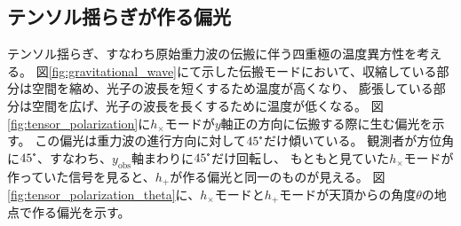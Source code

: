 \documentclass[../../main.tex]{subfiles}
\begin{document}
\subsection{テンソル揺らぎが作る偏光}
テンソル揺らぎ、すなわち原始重力波の伝搬に伴う四重極の温度異方性を考える。
図\ref{fig:gravitational_wave}にて示した伝搬モードにおいて、収縮している部分は空間を縮め、光子の波長を短くするため温度が高くなり、
膨張している部分は空間を広げ、光子の波長を長くするために温度が低くなる。
図\ref{fig:tensor_polarization}に$h_{\times}$モードが$y$軸正の方向に伝搬する際に生む偏光を示す。
この偏光は重力波の進行方向に対して$45\tcdegree$だけ傾いている。
観測者が方位角に$45\tcdegree$、すなわち、$y_{\mathrm{obs}}$軸まわりに$45\tcdegree$だけ回転し、
もともと見ていた$h_{\times}$モードが作っていた信号を見ると、$h_{+}$が作る偏光と同一のものが見える。
図\ref{fig:tensor_polarization_theta}に、$h_{\times}$モードと$h_{+}$モードが天頂からの角度$\theta$の地点で作る偏光を示す。
\end{document}
